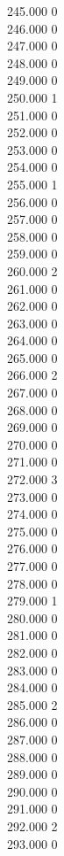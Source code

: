 { 245.000	0 \\
 246.000	0 \\
 247.000	0 \\
 248.000	0 \\
 249.000	0 \\
 250.000	1 \\
 251.000	0 \\
 252.000	0 \\
 253.000	0 \\
 254.000	0 \\
 255.000	1 \\
 256.000	0 \\
 257.000	0 \\
 258.000	0 \\
 259.000	0 \\
 260.000	2 \\
 261.000	0 \\
 262.000	0 \\
 263.000	0 \\
 264.000	0 \\
 265.000	0 \\
 266.000	2 \\
 267.000	0 \\
 268.000	0 \\
 269.000	0 \\
 270.000	0 \\
 271.000	0 \\
 272.000	3 \\
 273.000	0 \\
 274.000	0 \\
 275.000	0 \\
 276.000	0 \\
 277.000	0 \\
 278.000	0 \\
 279.000	1 \\
 280.000	0 \\
 281.000	0 \\
 282.000	0 \\
 283.000	0 \\
 284.000	0 \\
 285.000	2 \\
 286.000	0 \\
 287.000	0 \\
 288.000	0 \\
 289.000	0 \\
 290.000	0 \\
 291.000	0 \\
 292.000	2 \\
 293.000	0 \\
}
